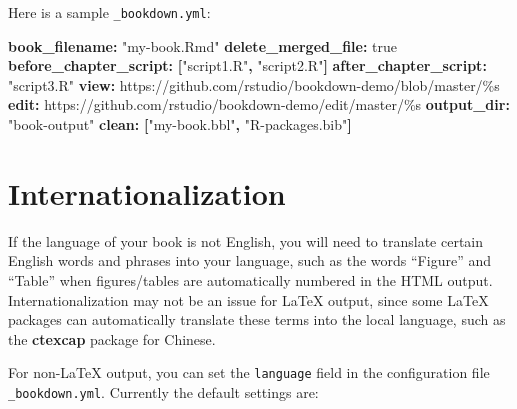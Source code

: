 \documentclass[
  12pt,
]{krantz}
\newenvironment{Shaded}{\begin{snugshade}}{\end{snugshade}}
\newcommand{\AttributeTok}[1]{\textcolor[rgb]{0.13,0.29,0.53}{#1}}
\newcommand{\CharTok}[1]{\textcolor[rgb]{0.31,0.60,0.02}{#1}}
\newcommand{\FunctionTok}[1]{\textcolor[rgb]{0.13,0.29,0.53}{\textbf{#1}}}
\newcommand{\KeywordTok}[1]{\textcolor[rgb]{0.13,0.29,0.53}{\textbf{#1}}}
\newcommand{\StringTok}[1]{\textcolor[rgb]{0.31,0.60,0.02}{#1}}
\theoremstyle{definition}
\theoremstyle{definition}
\theoremstyle{definition}
\theoremstyle{definition}
\theoremstyle{remark}
\begin{document}
Here is a sample \texttt{\_bookdown.yml}:

\begin{Shaded}
\begin{Highlighting}[]
\FunctionTok{book\_filename}\KeywordTok{:}\AttributeTok{ }\StringTok{"my{-}book.Rmd"}
\FunctionTok{delete\_merged\_file}\KeywordTok{:}\AttributeTok{ }\CharTok{true}
\FunctionTok{before\_chapter\_script}\KeywordTok{:}\AttributeTok{ }\KeywordTok{[}\StringTok{"script1.R"}\KeywordTok{,}\AttributeTok{ }\StringTok{"script2.R"}\KeywordTok{]}
\FunctionTok{after\_chapter\_script}\KeywordTok{:}\AttributeTok{ }\StringTok{"script3.R"}
\FunctionTok{view}\KeywordTok{:}\AttributeTok{ https://github.com/rstudio/bookdown{-}demo/blob/master/\%s}
\FunctionTok{edit}\KeywordTok{:}\AttributeTok{ https://github.com/rstudio/bookdown{-}demo/edit/master/\%s}
\FunctionTok{output\_dir}\KeywordTok{:}\AttributeTok{ }\StringTok{"book{-}output"}
\FunctionTok{clean}\KeywordTok{:}\AttributeTok{ }\KeywordTok{[}\StringTok{"my{-}book.bbl"}\KeywordTok{,}\AttributeTok{ }\StringTok{"R{-}packages.bib"}\KeywordTok{]}
\end{Highlighting}
\end{Shaded}

\section{Internationalization}\label{internationalization}

If the language of your book is not English, you will need to translate certain English words and phrases into your language, such as the words ``Figure'' and ``Table'' when figures/tables are automatically numbered in the HTML output. Internationalization may not be an issue for LaTeX output, since some LaTeX packages can automatically translate these terms into the local language, such as the \textbf{ctexcap} package for Chinese.

For non-LaTeX output, you can set the \texttt{language} field in the configuration file \texttt{\_bookdown.yml}. Currently the default settings are:
\end{document}
